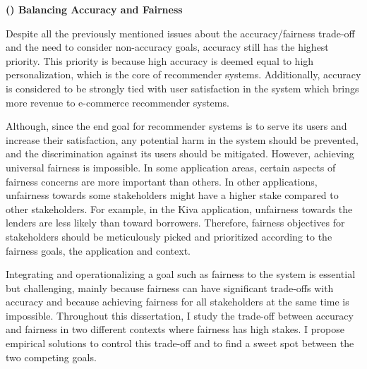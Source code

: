 \vspace{0.25cm}
\noindent \textbf{() Balancing Accuracy and Fairness}
\vspace{0.25cm}


Despite all the previously mentioned issues about the accuracy/fairness trade-off and the need to consider non-accuracy goals, accuracy still has the highest priority. This priority is because high accuracy is deemed equal to high personalization, which is the core of recommender systems. Additionally, accuracy is considered to be strongly tied with user satisfaction in the system which brings more revenue to e-commerce recommender systems. %


Although, since the end goal for recommender systems is to serve its users and increase their satisfaction, any potential harm in the system should be prevented, and the discrimination against its users should be mitigated. However, achieving universal fairness is impossible. In some application areas, certain aspects of fairness concerns are more important than others. In other applications, unfairness towards some stakeholders might have a higher stake compared to other stakeholders. For example, in the Kiva application, unfairness towards the lenders are less likely than toward borrowers. Therefore, fairness objectives for stakeholders should be meticulously picked and prioritized according to the fairness goals, the application and context.

Integrating and operationalizing a goal such as fairness to the system is essential but challenging, mainly because fairness can have significant trade-offs with accuracy and because achieving fairness for all stakeholders at the same time is impossible. Throughout this dissertation, I study the trade-off between accuracy and fairness in two different contexts where fairness has high stakes. I propose empirical solutions to control this trade-off and to find a sweet spot between the two competing goals. 


